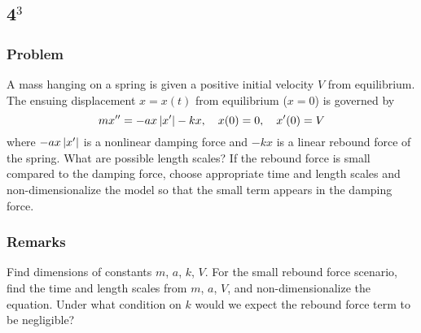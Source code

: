 \documentclass[12pt]{article}
\begin{document}

\newpage
\subsection{4$^3$}
\subsubsection*{Problem}
A mass hanging on a spring is given a positive initial velocity $V$ from
equilibrium. The ensuing displacement $x=x(t)$ from equilibrium ($x=0$) is
governed by
\begin{equation}
  \label{eq:4-problem}
  mx'' = -ax\left|{x'}\right|-kx, \quad x(0) = 0,\quad x'(0) = V
\end{equation}
where $-ax\left|{x'}\right|$ is a nonlinear damping force and $-kx$ is a linear rebound
force of the spring. What are possible length scales? If the rebound force is
small compared to the damping force, choose appropriate time and length scales
and non-dimensionalize the model so that the small term appears in the damping
force.

\subsubsection*{Remarks}
Find dimensions of constants $m$, $a$, $k$, $V$. For the small rebound force
scenario, find the time and length scales from $m$, $a$, $V$, and
non-dimensionalize the equation. Under what condition on $k$ would we expect the
rebound force term to be negligible?
\end{document}
